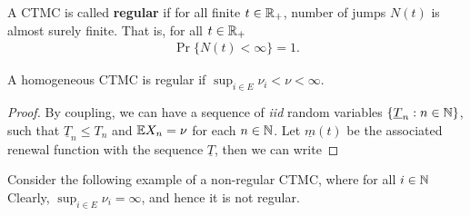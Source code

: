 \documentclass[a4paper,10pt,english]{article}
\begin{document}
A CTMC is called \textbf{regular} if for all finite $t \in \mathbb{R}_+$, number of jumps $N(t)$ is almost surely finite. 
That is, for all $t \in \mathbb{R}_+$
\begin{align*}
\Pr\{ N(t) < \infty \} = 1.
\end{align*} 
\begin{lem} 
A homogeneous CTMC is regular if $\sup_{i \in E} \nu_i < \nu < \infty$. 
\end{lem}
\begin{proof}
By coupling, we can have a sequence of \textit{iid} random variables $\{\underline{T}_n: n \in \mathbb{N}\}$, 
such that $\underline{T}_n \leq T_n$ and $\mathbb{E} X_n = \nu$ for each $n \in \mathbb{N}$. 
Let $\underline{m}(t)$ be the associated renewal function with the sequence $\underline{T}$, 
then we can write 
\end{proof}
\begin{shaded*}
Consider the following example of a non-regular CTMC, where for all $i \in \mathbb{N}$
Clearly, $\sup_{i \in E}\nu_i = \infty$, and hence it is not regular.
\end{shaded*}
\end{document}
